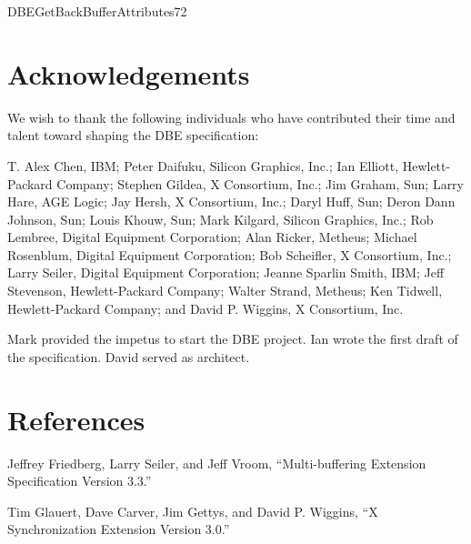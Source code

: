\begin{erequest}{DBEGetBackBufferAttributes}{7}{2}
\areply
{}
\end{erequest}

\pagebreak[4]
\section{Acknowledgements}

We wish to thank the following individuals who have contributed their
time and talent toward shaping the DBE specification:

T. Alex Chen, IBM;
Peter Daifuku, Silicon Graphics, Inc.; 
Ian Elliott, Hewlett-Packard Company;
Stephen Gildea, X Consortium, Inc.;
Jim Graham, Sun;
Larry Hare, AGE Logic;
Jay Hersh, X Consortium, Inc.;
Daryl Huff, Sun;
Deron Dann Johnson, Sun;
Louis Khouw, Sun;
Mark Kilgard, Silicon Graphics, Inc.;
Rob Lembree, Digital Equipment Corporation;
Alan Ricker, Metheus;
Michael Rosenblum, Digital Equipment Corporation;
Bob Scheifler, X Consortium, Inc.;
Larry Seiler, Digital Equipment Corporation;
Jeanne Sparlin Smith, IBM;
Jeff Stevenson, Hewlett-Packard Company;
Walter Strand, Metheus;
Ken Tidwell, Hewlett-Packard Company; and
David P. Wiggins, X Consortium, Inc.

Mark provided the impetus to start the DBE project.  Ian wrote the
first draft of the specification.  David served as architect.

\section{References}

Jeffrey Friedberg, Larry Seiler, and Jeff Vroom, ``Multi-buffering Extension
Specification Version 3.3.''

Tim Glauert, Dave Carver, Jim Gettys, and David P. Wiggins,
``X Synchronization Extension Version 3.0.'' 


